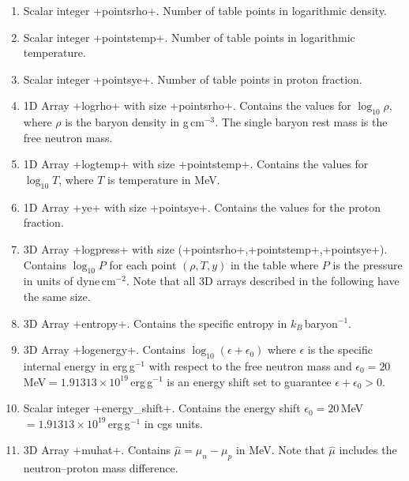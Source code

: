 \documentclass[letterpaper,11pt]{refart}
\begin{document}
\begin{enumerate}
 \item Scalar integer \verbprm+pointsrho+. Number of table points in
   logarithmic density. 

 \item Scalar integer \verbprm+pointstemp+. Number of table points in
   logarithmic temperature. 

 \item Scalar integer \verbprm+pointsye+. Number of table points in
   proton fraction. 

 \item 1D Array
   \verbprm+logrho+ with size \verbprm+pointsrho+. Contains the values
   for $\log_{10}\rho$, where $\rho$ is the baryon density in
   g\,cm$^{-3}$.  The single baryon rest mass is the free neutron
   mass. 
   
 \item 1D Array \verbprm+logtemp+ with size
   \verbprm+pointstemp+. Contains the values for $\log_{10}T$, where
   $T$ is temperature in MeV. 

 \item 1D Array \verbprm+ye+ with size \verbprm+pointsye+. Contains
   the values for the proton fraction.
   
 \item 3D Array \verbprm+logpress+ with size
   (\verbprm+pointsrho+,\verbprm+pointstemp+,\verbprm+pointsye+). 
   Contains $\log_{10}P$ for each point $(\rho,T,y)$ in the table
   where $P$ is the pressure in units of dyne\,cm$^{-2}$. Note that 
   all 3D arrays described in the following have the same size. 
   
 \item 3D Array \verbprm+entropy+. Contains the specific entropy in
   $k_B$\,baryon$^{-1}$. 

 \item 3D Array
   \verbprm+logenergy+. Contains $\log_{10}(\epsilon+\epsilon_0)$
   where $\epsilon$ is the specific internal energy in erg\,g$^{-1}$
   with respect to the free neutron mass and
   $\epsilon_0=20$\,MeV$=1.91313\times10^{19}$\,erg\,g$^{-1}$ is an
   energy shift set to guarantee $\epsilon+\epsilon_0>0$.

 \item Scalar integer \verbprm+energy_shift+. Contains the energy shift
   $\epsilon_0=20$\,MeV$=1.91313 \times 10^{19}$\,erg\,g$^{-1}$ in cgs units.
   
 \item 3D Array \verbprm+muhat+. Contains $\hat\mu=\mu_n-\mu_p$ in MeV. 
   Note that $\hat\mu$ includes the neutron--proton mass difference. 
   

\end{enumerate}
\end{document}
